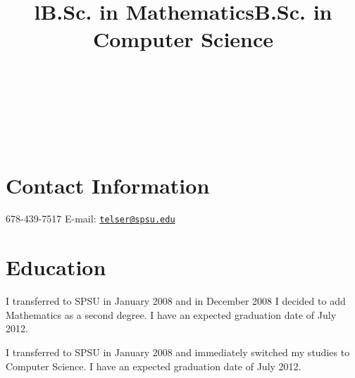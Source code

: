 \documentclass[margintitle,line]{res}
\begin{document}

\begin{resume}

\begin{format}
\\
\title{l}\\
\body\\
\end{format}



\section{Contact Information}

678-439-7517 \hfill {E-mail:} \href{mailto:telser@spsu.edu}{\nolinkurl{telser@spsu.edu}} \\


\section{Education}

\title{B.Sc. in Mathematics}
\begin{position}
   I transferred to SPSU in January 2008 and in December 2008 I decided to add Mathematics as a second degree.
  I have an expected graduation date of July 2012.
\end{position}

\title{B.Sc. in Computer Science}
\begin{position}
  I transferred to SPSU in January 2008 and immediately switched my studies to Computer Science.
  I have an expected graduation date of July 2012.
\end{position}


\end{resume}
\end{document}
